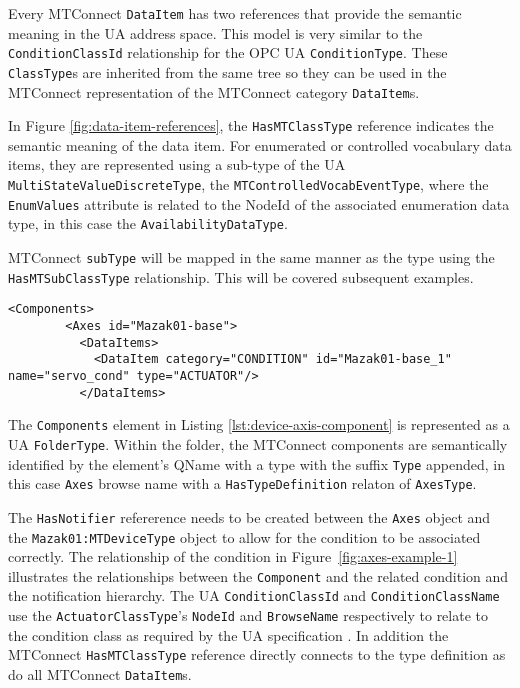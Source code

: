 Every MTConnect \texttt{Data\-Item} has two references that provide the semantic meaning in the UA address space. This model is very similar to the \texttt{Condition\-Class\-Id} relationship for the OPC UA \texttt{Condition\-Type}. These \texttt{Class\-Type}s are inherited from the same tree so they can be used in the MTConnect representation of the MTConnect  category \texttt{Data\-Item}s.



In Figure \ref{fig:data-item-references}, the \texttt{HasMTClassType} reference indicates the semantic meaning of the data item. For enumerated or controlled vocabulary data items, they are represented using a sub-type of the UA \texttt{Multi\-State\-Value\-Discrete\-Type}, the \texttt{MTControlled\-Vocab\-Event\-Type}, where the \texttt{Enum\-Values} attribute is related to the NodeId of the associated enumeration data type, in this case the \texttt{Availability\-Data\-Type}.

MTConnect \texttt{subType} will be mapped in the same manner as the type using the \texttt{HasMTSub\-Class\-Type} relationship. This will be covered subsequent examples.

\begin{lstlisting}[firstnumber=last,%
    caption={Components and Conditions},label={lst:device-axis-component}]
      <Components>
        <Axes id="Mazak01-base">
          <DataItems>
            <DataItem category="CONDITION" id="Mazak01-base_1" name="servo_cond" type="ACTUATOR"/>
          </DataItems>
\end{lstlisting}

The \texttt{Components} element in Listing \ref{lst:device-axis-component} is represented as a UA \texttt{Folder\-Type}. Within the folder, the MTConnect components are semantically identified by the element's QName with a type with the suffix \texttt{Type} appended, in this case \texttt{Axes} browse name with a \texttt{HasTypeDefinition} relaton of \texttt{AxesType}. 



The \texttt{HasNotifier} refererence needs to be created between the \texttt{Axes} object and the \texttt{Mazak01\-:\-MTDeviceType} object to allow for the condition to be associated correctly. The relationship of the condition in Figure~\ref{fig:axes-example-1} illustrates the relationships between the \texttt{Component} and the related condition and the notification hierarchy. The UA \texttt{Condition\-ClassId} and \texttt{Condition\-ClassName} use the \texttt{Actuator\-ClassType}'s \texttt{NodeId} and \texttt{BrowseName} respectively to relate to the condition class as required by the UA specification \cite{UAPart9}. In addition the MTConnect \texttt{HasMTClassType} reference directly connects to the type definition as do all MTConnect \texttt{DataItem}s.

